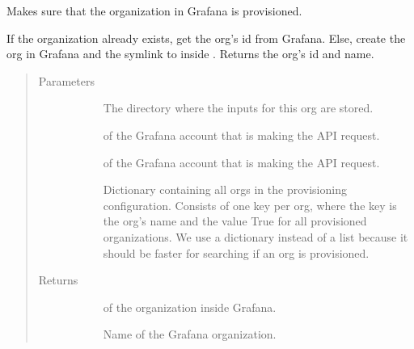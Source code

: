 \documentclass[letterpaper,10pt,english]{sphinxmanual}
\begin{document}
\begin{fulllineitems}
\label{\detokenize{inputs:gpInputs.provisionOrg}}
Makes sure that the organization in Grafana is provisioned.

If the organization already exists, get the org’s id from Grafana. Else, create
the org in Grafana and the symlink to  inside . Returns
the org’s id and name.
\begin{quote}\begin{description}
\item[{Parameters}] \leavevmode\begin{description}
\item[{}] \leavevmode{[}\sphinxtitleref{str}{]}
The directory where the inputs for this org are stored.

\item[{}] \leavevmode{[}\sphinxtitleref{str}{]}
 of the Grafana account that is making the API request.

\item[{}] \leavevmode{[}\sphinxtitleref{str}{]}
 of the Grafana account that is making the API request.

\item[{}] \leavevmode{[}\sphinxtitleref{dict}{]}
Dictionary containing all orgs in the provisioning configuration. Consists
of one key per org, where the key is the org’s name and the value True for
all provisioned organizations. We use a dictionary instead of a list
because it should be faster for searching if an org is provisioned.

\end{description}

\item[{Returns}] \leavevmode\begin{description}
\item[{}] \leavevmode{[}\sphinxtitleref{int}{]}
 of the organization inside Grafana.

\item[{}] \leavevmode
Name of the Grafana organization.


\end{description}
\end{description}
\end{quote}
\end{fulllineitems}
\end{document}

